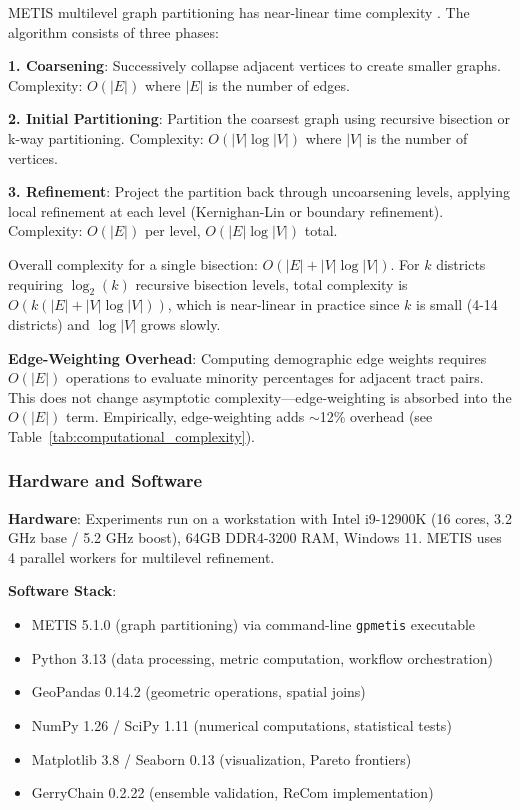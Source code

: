 METIS multilevel graph partitioning has near-linear time complexity \citep{karypis1998}. The algorithm consists of three phases:

\textbf{1. Coarsening}: Successively collapse adjacent vertices to create smaller graphs. Complexity: $O(|E|)$ where $|E|$ is the number of edges.

\textbf{2. Initial Partitioning}: Partition the coarsest graph using recursive bisection or k-way partitioning. Complexity: $O(|V|\log|V|)$ where $|V|$ is the number of vertices.

\textbf{3. Refinement}: Project the partition back through uncoarsening levels, applying local refinement at each level (Kernighan-Lin or boundary refinement). Complexity: $O(|E|)$ per level, $O(|E|\log|V|)$ total.

Overall complexity for a single bisection: $O(|E| + |V|\log|V|)$. For $k$ districts requiring $\log_2(k)$ recursive bisection levels, total complexity is $O(k(|E| + |V|\log|V|))$, which is near-linear in practice since $k$ is small (4-14 districts) and $\log|V|$ grows slowly.

\textbf{Edge-Weighting Overhead}: Computing demographic edge weights requires $O(|E|)$ operations to evaluate minority percentages for adjacent tract pairs. This does not change asymptotic complexity---edge-weighting is absorbed into the $O(|E|)$ term. Empirically, edge-weighting adds $\sim$12\% overhead (see Table~\ref{tab:computational_complexity}).

\subsubsection{Hardware and Software}

\textbf{Hardware}: Experiments run on a workstation with Intel i9-12900K (16 cores, 3.2 GHz base / 5.2 GHz boost), 64GB DDR4-3200 RAM, Windows 11. METIS uses 4 parallel workers for multilevel refinement.

\textbf{Software Stack}:
\begin{itemize}
    \item METIS 5.1.0 (graph partitioning) via command-line \texttt{gpmetis} executable
    \item Python 3.13 (data processing, metric computation, workflow orchestration)
    \item GeoPandas 0.14.2 (geometric operations, spatial joins)
    \item NumPy 1.26 / SciPy 1.11 (numerical computations, statistical tests)
    \item Matplotlib 3.8 / Seaborn 0.13 (visualization, Pareto frontiers)
    \item GerryChain 0.2.22 (ensemble validation, ReCom implementation)
\end{itemize}

